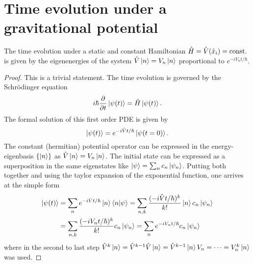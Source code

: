 \section{Time evolution under a gravitational potential}\label{sec:2:time-evolution}

\begin{proposition} \label{proposition:time-evolution}
  The time evolution under a static and constant Hamiltonian $\hat{H} = \hat{V}(\hat{x}_i) = \mathrm{const.}$ is given by the eigenenergies of the system $\hat{V}\ket{n} = V_n\ket{n}$ proportional to $e^{-iV_nt/\hbar}$.
\end{proposition}
\begin{proof}
  This is a trivial statement. The time evolution is governed by the Schrödinger equation
  \begin{equation}
    i\hbar \pdv{t}\ket{\psi(t)} = \hat{H} \ket{\psi(t)} .
  \end{equation}
  The formal solution of this first order PDE is given by
  \begin{equation}
    \ket{\psi(t)} = e^{-i\hat{V}t/\hbar} \ket{\psi(t=0)} .
  \end{equation}
  The constant (hermitian) potential operator can be expressed in the energy-eigenbasis $\left\{\ket{n}\right\}$ as $\hat{V}\ket{n} = V_n\ket{n}$. The initial state can be expressed as a superposition in the same eigenstates like $\ket{\psi} = \sum_n c_n \ket{\psi_n}$. Putting both together and using the taylor expansion of the exponential function, one arrives at the simple form
  \begin{align}
    \ket{\psi(t)} &= \sum_n e^{-i\hat{V}t/\hbar} \ket{n} \braket{n}{\psi} = \sum_{n,k} \frac{(-i\hat{V}t/\hbar)^k}{k!} \ket{n} c_n \ket{\psi_n} \\
    &= \sum_{n,k} \frac{(-iV_n t/\hbar)^k}{k!} c_n \ket{\psi_n} 
    = \sum_n e^{-iV_nt/\hbar} c_n \ket{\psi_n}
  \end{align}
  where in the second to last step $\hat{V}^k\ket{n} = \hat{V}^{k-1}\hat{V}\ket{n} = \hat{V}^{k-1}\ket{n} V_n = \dots = V_n^k\ket{n}$ was used.
\end{proof}

